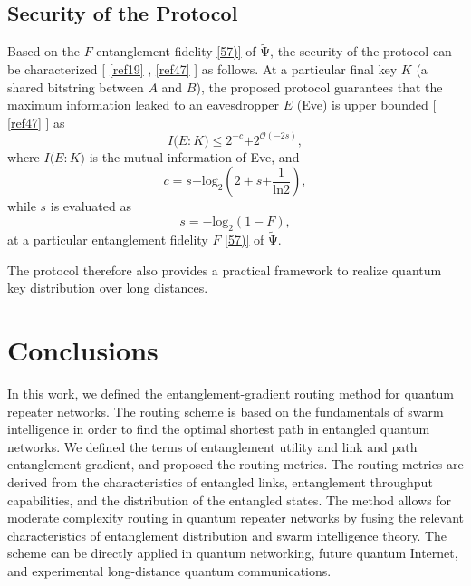 \documentclass[11pt]{article}%
\newcommand*{\cref}[1]{%
  \begingroup
    \hypersetup{
      linkcolor=linkequation,
      linkbordercolor=linkequation,
    }%
    \ref{#1}%
  \endgroup
}
\begin{document}
\subsection{Security of the Protocol}
Based on the $F$ entanglement fidelity \eqref{57)} of $\widetilde{\mathrm{\Psi }}$, the security of the protocol can be characterized [\cref{ref19}, \cref{ref47}] as follows. At a particular final key $K$ (a shared bitstring between $A$ and $B$), the proposed protocol guarantees that the maximum information leaked to an eavesdropper $E$ (Eve) is upper bounded [\cref{ref47}] as
\begin{equation} \label{62)} 
I\mathrm{(}E\mathrm{:}K\mathrm{)}\mathrm{\le }{\mathrm{2}}^{\mathrm{-}c}\mathrm{+}{\mathrm{2}}^{\mathcal{O}\left(\mathrm{-}\mathrm{2}s\right)},                                                                             
\end{equation} 
where $I\mathrm{(}E\mathrm{:}K\mathrm{)}$ is the mutual information of Eve, and 
\begin{equation} \label{63)} 
c\mathrm{=}s\mathrm{-}\mathrm{lo}{\mathrm{g}}_{\mathrm{2}}\left(\mathrm{2+}s\mathrm{+}\frac{\mathrm{1}}{\mathrm{ln2}}\right), 
\end{equation} 
while $s$ is evaluated as
\begin{equation} \label{64)} 
s\mathrm{=-lo}{\mathrm{g}}_{\mathrm{2}}\left(\mathrm{1-}F\right),                                                                                  
\end{equation} 
at a particular entanglement fidelity $F$ \eqref{57)} of $\widetilde{\mathrm{\Psi }}$. 

The protocol therefore also provides a practical framework to realize quantum key distribution over long distances. 

\section{Conclusions}
\label{sec6}
In this work, we defined the entanglement-gradient routing method for quantum repeater networks. The routing scheme is based on the fundamentals of swarm intelligence in order to find the optimal shortest path in entangled quantum networks. We defined the terms of entanglement utility and link and path entanglement gradient, and proposed the routing metrics. The routing metrics are derived from the characteristics of entangled links, entanglement throughput capabilities, and the distribution of the entangled states. The method allows for moderate complexity routing in quantum repeater networks by fusing the relevant characteristics of entanglement distribution and swarm intelligence theory. The scheme can be directly applied in quantum networking, future quantum Internet, and experimental long-distance quantum communications. 
\end{document}
